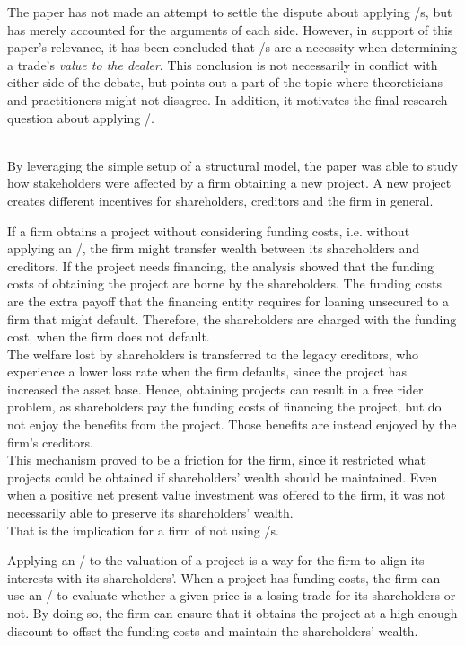 \documentclass[main.tex]{subfiles}
\begin{document}
    The paper has not made an attempt to settle the dispute about applying \FVA/s,
    but has merely accounted for the arguments of each side.
    However, in support of this paper's relevance,
    it has been concluded that \FVA/s are a necessity 
    when determining a trade's \textit{value to the dealer}.
    This conclusion is not necessarily in conflict with either side of the debate,
    but points out a part of the topic where theoreticians and practitioners might not disagree.
    In addition, it motivates the final research question about applying \FVA/.

    \textbf{\researchQuestionFvaImplications}\\
    By leveraging the simple setup of a structural model,
    the paper was able to study how stakeholders were affected by a firm obtaining a new project.
    A new project creates different incentives for shareholders, creditors and the firm in general.

    If a firm obtains a project without considering funding costs, 
    i.e. without applying an \FVA/,
    the firm might transfer wealth between its shareholders and creditors.
    If the project needs financing, 
    the analysis showed that the funding costs 
    of obtaining the project are borne by the shareholders.
    The funding costs are the extra payoff that the financing entity requires
    for loaning unsecured to a firm that might default.
    Therefore, the shareholders are charged with the funding cost, when the firm does not default.
    \\
    The welfare lost by shareholders is transferred to the legacy creditors,
    who experience a lower loss rate when the firm defaults, 
    since the project has increased the asset base.
    Hence, obtaining projects can result in a free rider problem, 
    as shareholders pay the funding costs of financing the project,
    but do not enjoy the benefits from the project.
    Those benefits are instead enjoyed by the firm's creditors. 
    \\
    This mechanism proved to be a friction for the firm, 
    since it restricted what projects could be obtained if shareholders' wealth should be maintained.
    Even when a positive net present value investment was offered to the firm, 
    it was not necessarily able to preserve its shareholders' wealth.
    \\
    That is the implication for a firm of not using \FVA/s.

    Applying an \FVA/ to the valuation of a project is a way for the firm 
    to align its interests with its shareholders'.
    When a project has funding costs,
    the firm can use an \FVA/ to evaluate
    whether a given price is a losing trade for its shareholders or not.
    By doing so, the firm can ensure that it obtains the project at a high enough discount
    to offset the funding costs and maintain the shareholders' wealth.
\end{document}
